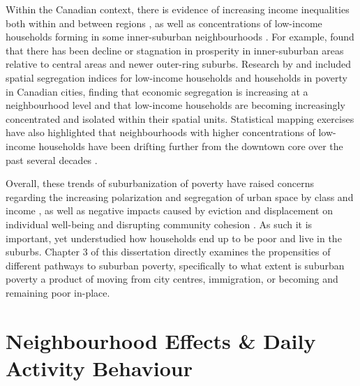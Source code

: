 Within the Canadian context, there is evidence of increasing income inequalities both within and between regions \cite{maclachlan_measures_1997,walks_income_2013,bolton_growing_2012,breau_rising_2015,chen_why_2012}, as well as concentrations of low-income households forming in some inner-suburban neighbourhoods \cite{ades_are_2012,pavlic_declining_2014,ades_is_2016,breau_pulling_2018}. For example,  found that there has been decline or stagnation in prosperity in inner-suburban areas relative to central areas and newer outer-ring suburbs. Research by  and  included spatial segregation indices for low-income households and households in poverty in Canadian cities, finding that economic segregation is increasing at a neighbourhood level and that low-income households are becoming increasingly concentrated and isolated within their spatial units. Statistical mapping exercises have also highlighted that neighbourhoods with higher concentrations of low-income households have been drifting further from the downtown core over the past several decades \cite{ades_are_2012,breau_pulling_2018}.

Overall, these trends of suburbanization of poverty have raised concerns regarding the increasing polarization and segregation of urban space by class and income \cite{hulchanski_three_2010,walks_income_2013,ades_are_2012}, as well as negative impacts caused by eviction and displacement on individual well-being and disrupting community cohesion \cite{august_challenging_2014,august_its_2016}. As such it is important, yet understudied how households end up to be poor and live in the suburbs. Chapter 3 of this dissertation directly examines the propensities of different pathways to suburban poverty, specifically to what extent is suburban poverty a product of moving from city centres, immigration, or becoming and remaining poor in-place.


\section{Neighbourhood Effects \& Daily Activity Behaviour}

